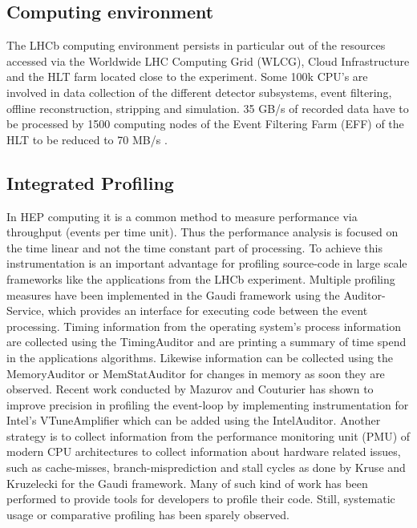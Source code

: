 \documentclass[a4paper]{jpconf}
\begin{document}
\subsection{Computing environment}
\label{sec:computing_environment}

The LHCb computing environment persists in particular out of the resources accessed via the Worldwide LHC Computing Grid (WLCG), Cloud Infrastructure and the HLT farm located close to the experiment. Some 100k CPU's are involved in  data collection of the different detector subsystems, event filtering, offline reconstruction, stripping and simulation. 35 GB/s of recorded data have to be processed by 1500 computing nodes of the Event Filtering Farm (EFF) of the HLT to be reduced to 70 MB/s \cite{lhcb_hlt_opt}.

\subsection{Integrated Profiling}
\label{sec:integrated_profiling}

In HEP computing it is a common method to measure performance via throughput (events per time unit). Thus the performance analysis is focused on the time linear and not the time constant part of processing. To achieve this instrumentation is an important advantage for profiling source-code in large scale frameworks like the applications from the LHCb experiment. Multiple profiling measures have been implemented in the Gaudi framework using the Auditor-Service, which provides an interface for executing code between the event processing.
\newline
Timing information from the operating system's process information are collected using the TimingAuditor and are printing a summary of time spend in the applications algorithms. Likewise information can be collected using the MemoryAuditor or MemStatAuditor for changes in memory as soon they are observed. Recent work \cite{intel_auditor} conducted by Mazurov and Couturier has shown to improve precision in profiling the event-loop by implementing instrumentation for Intel's  VTune\texttrademark Amplifier which can be added using the IntelAuditor. Another strategy is to collect information from the performance monitoring unit (PMU) of modern CPU architectures to collect information about hardware related issues, such as cache-misses, branch-misprediction and stall cycles as done by Kruse and Kruzelecki \cite{modular_monitoring} for the Gaudi framework.
\newline
Many of such kind of work has been performed to provide tools for developers to profile their code. Still, systematic usage or comparative profiling has been sparely observed.
\end{document}
